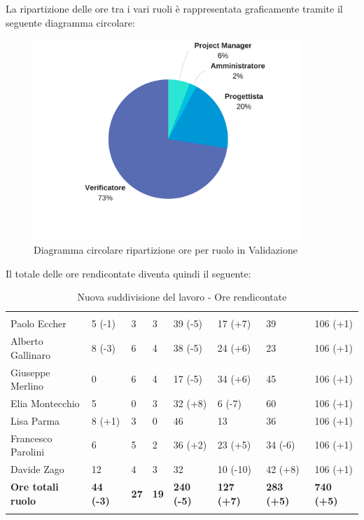 La ripartizione delle ore tra i vari ruoli è rappresentata graficamente tramite il seguente diagramma circolare:
\begin{figure}[H] 
	\centering 
	\includegraphics[width=0.9\textwidth]{images/CircolareValidazioneNuova.png} 
	\caption{Diagramma circolare ripartizione ore per ruolo in Validazione}
	\label{CircolareValidazione}
\end{figure}

Il totale delle ore rendicontate diventa quindi il seguente:
			\begin{table}[H]
	\centering
	\begin{tabular}{|C{4cm}|C{0.8cm}|C{0.8cm}|C{0.8cm}|C{0.8cm}|C{0.8cm}|C{0.8cm}|C{3cm}|}
		 & & &&&&&\\
		Paolo Eccher       & 5 (-1) & 3 & 3 & 39 (-5) & 17 (+7) & 39 & 106 (+1) \\
		\hline
		Alberto Gallinaro  & 8 (-3) & 6 & 4 & 38 (-5) & 24 (+6) & 23 & 106 (+1) \\
		\hline
		Giuseppe Merlino   & 0 & 6 & 4 & 17 (-5) & 34 (+6) & 45 & 106 (+1) \\
		\hline
		Elia Montecchio    & 5 & 0 & 3 & 32 (+8) & 6 (-7) & 60 & 106 (+1) \\
		\hline
		Lisa Parma         & 8 (+1) & 3 & 0 & 46 & 13 & 36 & 106 (+1) \\
		\hline
		Francesco Parolini& 6 & 5 & 2 & 36 (+2) & 23 (+5) & 34 (-6) & 106 (+1) \\
		\hline
		Davide Zago        & 12 & 4 & 3 & 32 & 10 (-10) & 42 (+8) & 106 (+1) \\
		\hline
		\textbf{Ore totali ruolo}  & \textbf{44 (-3)} & \textbf{27} & \textbf{19} & \textbf{240 (-5)} & \textbf{127 (+7)} & \textbf{283 (+5)} & \textbf{740 (+5)} \\
	\end{tabular}
	\caption{Nuova suddivisione del lavoro - Ore rendicontate }
\end{table}

